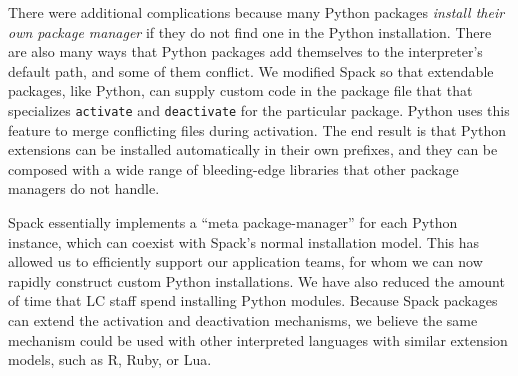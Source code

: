 There were additional complications because many Python packages {\it install their own
package manager} if they do not find one in the Python installation.
There are also many ways that Python packages add themselves to the
interpreter's default path, and some of them conflict. We modified
Spack so that extendable packages, like Python, can supply custom code
in the package file that that specializes {\tt activate} and {\tt deactivate}
for the particular package. Python uses this feature to merge conflicting
files during activation.  The end result is that Python extensions can
be installed automatically in their own prefixes, and they can be composed
with a wide range of bleeding-edge libraries that other package managers do
not handle.


Spack essentially implements a ``meta package-manager'' for each Python
instance, which can coexist with Spack's normal installation model.
This has allowed us to efficiently support our application teams, for whom we can
now rapidly construct custom Python installations.  We have also reduced
the amount of time that LC staff spend installing Python modules.
Because Spack packages can extend the activation and deactivation mechanisms,
we believe the same mechanism could be used with other
interpreted languages with similar extension models, such as R, Ruby, or Lua.
